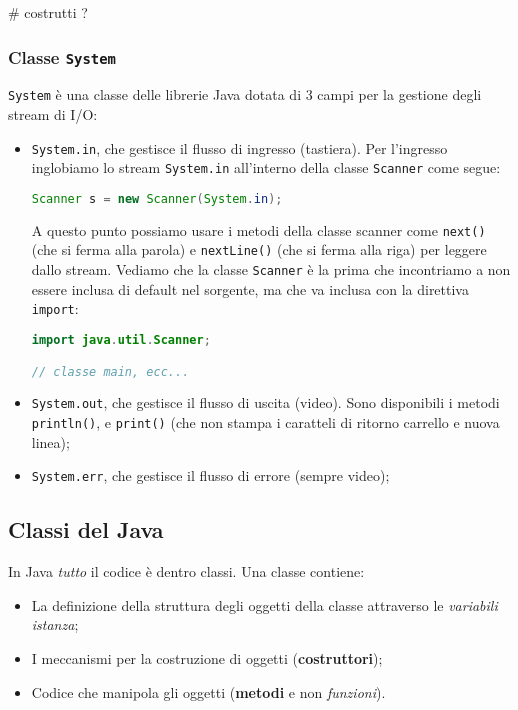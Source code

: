 \documentclass[a4paper,11pt]{article}
\begin{document}
# costrutti ?

\subsubsection{Classe \lstinline|System|}
\lstinline|System| è una classe delle librerie Java dotata di 3 campi per la gestione degli stream di I/O:
\begin{itemize}
	\item \lstinline|System.in|, che gestisce il flusso di ingresso (tastiera).
		Per l'ingresso inglobiamo lo stream \lstinline|System.in| all'interno della classe \lstinline|Scanner| come segue:
\begin{lstlisting}[language=java, style=codestyle]	
Scanner s = new Scanner(System.in);
\end{lstlisting}
A questo punto possiamo usare i metodi della classe scanner come \lstinline|next()| (che si ferma alla parola) e \lstinline|nextLine()| (che si ferma alla riga) per leggere dallo stream.
Vediamo che la classe \lstinline|Scanner| è la prima che incontriamo a non essere inclusa di default nel sorgente, ma che va inclusa con la direttiva \lstinline|import|:
\begin{lstlisting}[language=java, style=codestyle]	
import java.util.Scanner;

// classe main, ecc... 
\end{lstlisting}
	\item \lstinline|System.out|, che gestisce il flusso di uscita (video). Sono disponibili i metodi \lstinline|println()|, e \lstinline|print()| (che non stampa i caratteli di ritorno carrello e nuova linea);
	\item \lstinline|System.err|, che gestisce il flusso di errore (sempre video);
\end{itemize}

\subsection{Classi del Java}
In Java \textit{tutto} il codice è dentro classi.
Una classe contiene:
\begin{itemize}
	\item La definizione della struttura degli oggetti della classe attraverso le \textit{variabili istanza};
	\item I meccanismi per la costruzione di oggetti (\textbf{costruttori});
	\item Codice che manipola gli oggetti (\textbf{metodi} e non \textit{funzioni}).
\end{itemize}
\end{document}

